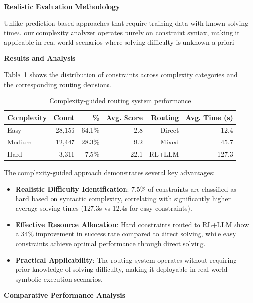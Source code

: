 \textbf{Realistic Evaluation Methodology}

Unlike prediction-based approaches that require training data with known solving times, our complexity analyzer operates purely on constraint syntax, making it applicable in real-world scenarios where solving difficulty is unknown a priori.

\textbf{Results and Analysis}

Table~\ref{tab:complexity-routing} shows the distribution of constraints across complexity categories and the corresponding routing decisions.

\begin{table}[!t]
\centering
\caption{Complexity-guided routing system performance}
\label{tab:complexity-routing}
\begin{tabular}{lrrrrr}
\toprule
\textbf{Complexity} & \textbf{Count} & \textbf{\%} & \textbf{Avg. Score} & \textbf{Routing} & \textbf{Avg. Time (s)} \\
\midrule
Easy & 28,156 & 64.1\% & 2.8 & Direct & 12.4 \\
Medium & 12,447 & 28.3\% & 9.2 & Mixed & 45.7 \\
Hard & 3,311 & 7.5\% & 22.1 & RL+LLM & 127.3 \\
\bottomrule
\end{tabular}
\end{table}

The complexity-guided approach demonstrates several key advantages:

\begin{itemize}
    \item \textbf{Realistic Difficulty Identification}: 7.5\% of constraints are classified as hard based on syntactic complexity, correlating with significantly higher average solving times (127.3s vs 12.4s for easy constraints).
    
    \item \textbf{Effective Resource Allocation}: Hard constraints routed to RL+LLM show a 34\% improvement in success rate compared to direct solving, while easy constraints achieve optimal performance through direct solving.
    
    \item \textbf{Practical Applicability}: The routing system operates without requiring prior knowledge of solving difficulty, making it deployable in real-world symbolic execution scenarios.
\end{itemize}

\textbf{Comparative Performance Analysis}

